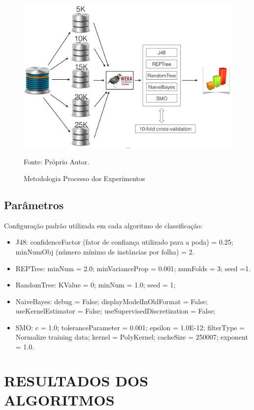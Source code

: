 \documentclass[
	12pt,				%
	openright,			%
	oneside,	
	a4paper,				%
	english,				%
	brazil				%
]{abntex2/abntex2} %
\begin{document}
	
	\begin{figure}[!htb]
		\caption{\label{figmetodologiaExperimentos} Metodologia Processo dos Experimentos}
		\begin{center}
			\includegraphics[scale=0.55]{img/metodologiaExperimentos.png}
		\end{center}
		{\fontsize{10}{\baselineskip} \selectfont Fonte: Próprio Autor.}
	\end{figure}
	
	\subsection{Parâmetros }
	Configuração padrão utilizada em cada algoritmo de classificação:
	
	\begin{itemize}
		\item J48: confidenceFactor  (fator de confiança utilizado para a poda) = 0.25; minNumObj (número mínimo de instâncias por folha) = 2.
		\item REPTree: minNum = 2.0; minVarianceProp = 0.001; numFolds = 3; seed =1.
		\item RandomTree: KValue = 0; minNum = 1.0; seed = 1;
		\item NaiveBayes: debug = False; displayModelInOldFormat = False; useKernelEstimator = False; useSupervisedDiscretization = False;
		\item SMO: c = 1.0; toleranceParameter = 0.001; epsilon = 1.0E-12; filterType = Normalize training data; kernel = PolyKernel; cacheSize = 250007; exponent = 1.0.
	\end{itemize}
	
	\section{RESULTADOS DOS ALGORITMOS}
	
\end{document}
